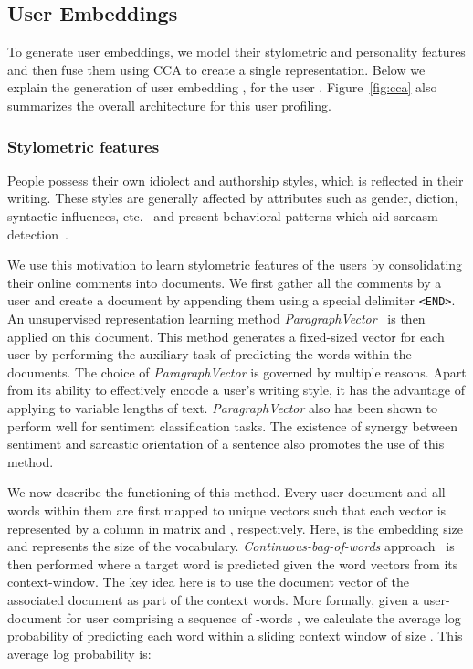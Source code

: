 \documentclass[11pt]{article}
\begin{document}
\subsection{User Embeddings} \label{sec:user}
To generate user embeddings,  we model their stylometric and personality features and then fuse them using CCA to create a single representation. Below we explain the generation of user embedding , for the  user . Figure~\ref{fig:cca} also summarizes the overall architecture for this user profiling.

\subsubsection{Stylometric features} \label{sec:stylometric}
People possess their own idiolect and authorship styles, which is reflected in their writing. These styles are generally affected by attributes such as gender, diction, syntactic influences, etc.~\cite{cheng2011author,stamatatos2009survey} and present behavioral patterns which aid sarcasm detection~\cite{rajadesingan2015sarcasm}.  

We use this motivation to learn stylometric features of the users by consolidating their online comments into documents. We first gather all the comments by a user and create a document by appending them using a special delimiter \verb|<END>|. An unsupervised representation learning method \textit{ParagraphVector}~\cite{le2014distributed} is then applied on this document. This method generates a fixed-sized vector for each user by performing the auxiliary task of predicting the words within the documents. The choice of \textit{ParagraphVector} is governed by multiple reasons. Apart from its ability to effectively encode a user's writing style, it has the advantage of applying to variable lengths of text. \textit{ParagraphVector} also has been shown to perform well for sentiment classification tasks. The existence of synergy between sentiment and sarcastic orientation of a sentence also promotes the use of this method.


We now describe the functioning of this method. Every user-document and all words within them are first mapped to unique vectors such that each vector is represented by a column in matrix  and , respectively. Here,  is the embedding size and  represents the size of the vocabulary. \textit{Continuous-bag-of-words} approach~\cite{mikolov2013distributed} is then performed where a target word is predicted given the word vectors from its context-window. The key idea here is to use the document vector of the associated document as part of the context words. More formally, given a user-document  for user  comprising a sequence of -words , we calculate the average log probability of predicting each word within a sliding context window of size . This average log probability is:
\end{document}
